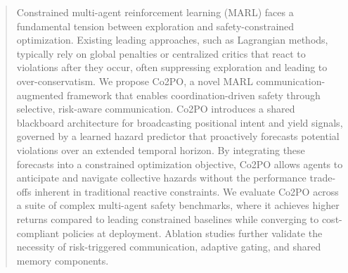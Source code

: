 \documentclass{article}
\theoremstyle{plain}
\theoremstyle{definition}
\theoremstyle{remark}
\begin{document}

\printAffiliationsAndNotice{\icmlEqualContribution}  %

\begin{abstract}
Constrained multi-agent reinforcement learning (MARL) faces a fundamental tension between exploration and safety-constrained optimization. Existing leading approaches, such as Lagrangian methods, typically rely on global penalties or centralized critics that react to violations after they occur, often suppressing exploration and leading to over-conservatism. We propose Co2PO, a novel MARL communication-augmented framework that enables coordination-driven safety through selective, risk-aware communication. Co2PO introduces a shared blackboard architecture for broadcasting positional intent and yield signals, governed by a learned hazard predictor that proactively forecasts potential violations over an extended temporal horizon. By integrating these forecasts into a constrained optimization objective, Co2PO allows agents to anticipate and navigate collective hazards without the performance trade-offs inherent in traditional reactive constraints. We evaluate Co2PO across a suite of complex multi-agent safety benchmarks, where it achieves higher returns compared to leading constrained baselines while converging to cost-compliant policies at deployment. Ablation studies further validate the necessity of risk-triggered communication, adaptive gating, and shared memory components.
\end{abstract}
\end{document}
